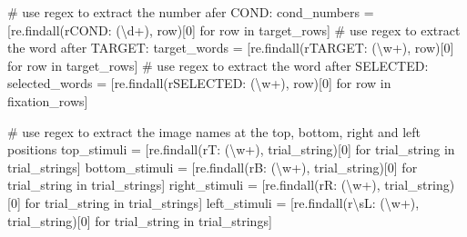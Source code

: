 \documentclass[
  a4paper,
]{article}
\newenvironment{Shaded}{}{}
\newcommand{\CommentTok}[1]{\textcolor[rgb]{0.42,0.45,0.49}{#1}}
\newcommand{\ControlFlowTok}[1]{\textcolor[rgb]{0.84,0.23,0.29}{#1}}
\newcommand{\DecValTok}[1]{\textcolor[rgb]{0.00,0.36,0.77}{#1}}
\newcommand{\KeywordTok}[1]{\textcolor[rgb]{0.84,0.23,0.29}{#1}}
\newcommand{\NormalTok}[1]{\textcolor[rgb]{0.14,0.16,0.18}{#1}}
\newcommand{\OperatorTok}[1]{\textcolor[rgb]{0.14,0.16,0.18}{#1}}
\newcommand{\VerbatimStringTok}[1]{\textcolor[rgb]{0.01,0.18,0.38}{#1}}
\begin{document}
\begin{Shaded}
\begin{Highlighting}[]
\CommentTok{\# use regex to extract the number afer \textquotesingle{}COND:\textquotesingle{}}
\NormalTok{cond\_numbers }\OperatorTok{=}\NormalTok{ [re.findall(}\VerbatimStringTok{r\textquotesingle{}COND: (\textbackslash{}d+)\textquotesingle{}}\NormalTok{, row)[}\DecValTok{0}\NormalTok{] }\ControlFlowTok{for}\NormalTok{ row }\KeywordTok{in}\NormalTok{ target\_rows]}
\CommentTok{\# use regex to extract the word after \textquotesingle{}TARGET:\textquotesingle{}}
\NormalTok{target\_words }\OperatorTok{=}\NormalTok{ [re.findall(}\VerbatimStringTok{r\textquotesingle{}TARGET: (\textbackslash{}w+)\textquotesingle{}}\NormalTok{, row)[}\DecValTok{0}\NormalTok{] }\ControlFlowTok{for}\NormalTok{ row }\KeywordTok{in}\NormalTok{ target\_rows]}
\CommentTok{\# use regex to extract the word after \textquotesingle{}SELECTED: \textquotesingle{}}
\NormalTok{selected\_words }\OperatorTok{=}\NormalTok{ [re.findall(}\VerbatimStringTok{r\textquotesingle{}SELECTED: (\textbackslash{}w+)\textquotesingle{}}\NormalTok{, row)[}\DecValTok{0}\NormalTok{] }\ControlFlowTok{for}\NormalTok{ row }\KeywordTok{in}\NormalTok{ fixation\_rows]}

\CommentTok{\# use regex to extract the image names at the top, bottom, right and left positions}
\NormalTok{top\_stimuli }\OperatorTok{=}\NormalTok{ [re.findall(}\VerbatimStringTok{r\textquotesingle{}T: (\textbackslash{}w+)\textquotesingle{}}\NormalTok{, trial\_string)[}\DecValTok{0}\NormalTok{] }\ControlFlowTok{for}\NormalTok{ trial\_string }\KeywordTok{in}\NormalTok{ trial\_strings]}
\NormalTok{bottom\_stimuli }\OperatorTok{=}\NormalTok{ [re.findall(}\VerbatimStringTok{r\textquotesingle{}B: (\textbackslash{}w+)\textquotesingle{}}\NormalTok{, trial\_string)[}\DecValTok{0}\NormalTok{] }\ControlFlowTok{for}\NormalTok{ trial\_string }\KeywordTok{in}\NormalTok{ trial\_strings]}
\NormalTok{right\_stimuli }\OperatorTok{=}\NormalTok{ [re.findall(}\VerbatimStringTok{r\textquotesingle{}R: (\textbackslash{}w+)\textquotesingle{}}\NormalTok{, trial\_string)[}\DecValTok{0}\NormalTok{] }\ControlFlowTok{for}\NormalTok{ trial\_string }\KeywordTok{in}\NormalTok{ trial\_strings]}
\NormalTok{left\_stimuli }\OperatorTok{=}\NormalTok{ [re.findall(}\VerbatimStringTok{r\textquotesingle{}\textbackslash{}sL: (\textbackslash{}w+)\textquotesingle{}}\NormalTok{, trial\_string)[}\DecValTok{0}\NormalTok{] }\ControlFlowTok{for}\NormalTok{ trial\_string }\KeywordTok{in}\NormalTok{ trial\_strings]}
\end{Highlighting}
\end{Shaded}
\end{document}
